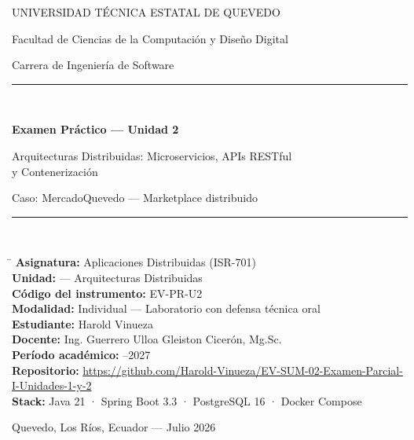 \documentclass[11pt,a4paper]{article}
\begin{document}
\begin{titlepage}
    \centering
    \vspace*{1cm}
    {\large UNIVERSIDAD TÉCNICA ESTATAL DE QUEVEDO\par}
    {\large Facultad de Ciencias de la Computación y Diseño Digital\par}
    {\large Carrera de Ingeniería de Software\par}
    \vspace{1.5cm}

    \rule{\linewidth}{0.5mm}\\[0.4cm]
    {\huge\bfseries Examen Práctico — Unidad 2\par}
    \vspace{0.3cm}
    {\Large Arquitecturas Distribuidas: Microservicios, APIs RESTful\\ y Contenerización\par}
    \vspace{0.2cm}
    {\large Caso: MercadoQuevedo — Marketplace distribuido\par}
    \rule{\linewidth}{0.5mm}\\[1.5cm]

    \begin{tabbing}
        \hspace{4cm} \= \kill
        \textbf{Asignatura:} \> Aplicaciones Distribuidas (ISR-701) \\[0.2cm]
        \textbf{Unidad:}  — Arquitecturas Distribuidas \\[0.2cm]
        \textbf{Código del instrumento:} \> EV-PR-U2 \\[0.2cm]
        \textbf{Modalidad:} \> Individual — Laboratorio con defensa técnica oral \\[0.2cm]
        \textbf{Estudiante:} \> Harold Vinueza \\[0.2cm]
        \textbf{Docente:} \> Ing. Guerrero Ulloa Gleiston Cicerón, Mg.Sc. \\[0.2cm]
        \textbf{Período académico:} --2027 \\[0.2cm]
        \textbf{Repositorio:} \> \url{https://github.com/Harold-Vinueza/EV-SUM-02-Examen-Parcial-I-Unidades-1-y-2} \\[0.2cm]
        \textbf{Stack:} \> Java 21 · Spring Boot 3.3 · PostgreSQL 16 · Docker Compose
    \end{tabbing}

    \vfill
    {\large Quevedo, Los Ríos, Ecuador — Julio 2026\par}
\end{titlepage}
\end{document}
